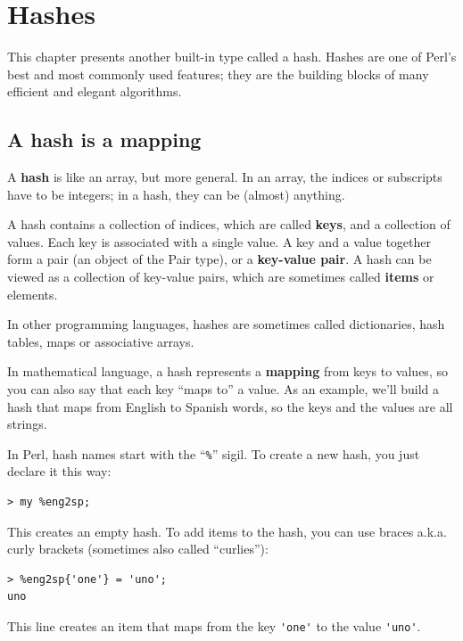 
\chapter{Hashes}
\label{hashes}

This chapter presents another built-in type called a hash. 
Hashes are one of Perl's best and most commonly used 
features; they are the building blocks of many efficient 
and elegant algorithms.


\section{A hash is a mapping}
\label{hash_descr}

A {\bf hash} is like an array, but more general.  In an 
array, the indices or subscripts have to be integers; in a hash, 
they can be (almost) anything.

A hash contains a collection of indices, which are called 
{\bf keys}, and a collection of values.  Each key is associated with a single value.  A key and a value together form a pair 
(an object of the Pair type), or a {\bf key-value pair}. A 
hash can be viewed as a collection of key-value pairs, which 
are sometimes called {\bf items} or elements.  

In other programming languages, hashes are sometimes called 
dictionaries, hash tables, maps or associative arrays.

In mathematical language, a hash represents a {\bf mapping}
from keys to values, so you can also say that each key
``maps to'' a value. As an example, we'll build a hash that 
maps from English to Spanish words, so the keys and the 
values are all strings.

In Perl, hash names start with the ``\verb"%"'' sigil. To create 
a new hash, you just declare it this way:

\begin{verbatim}
> my %eng2sp;
\end{verbatim}

This creates an empty hash. To add items to the hash, 
you can use braces a.k.a. curly brackets (sometimes also 
called ``curlies''):

\begin{verbatim}
> %eng2sp{'one'} = 'uno';
uno
\end{verbatim}
%
This line creates an item that maps from the key
\verb"'one'" to the value \verb"'uno'".  

